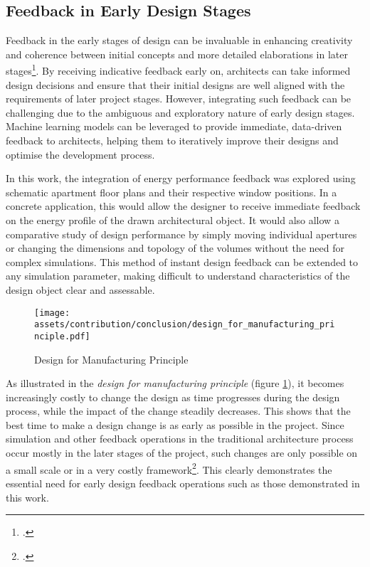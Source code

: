 \documentclass[a4paper, 12pt]{report}
\begin{document}
\subsection{Feedback in Early Design Stages}\label{sec:feedback-in-early-design-stages-conclusion}

Feedback in the early stages of design can be invaluable in enhancing creativity and coherence between initial concepts and more detailed elaborations in later stages\footcite{paterson2013real}. By receiving indicative feedback early on, architects can take informed design decisions and ensure that their initial designs are well aligned with the requirements of later project stages. However, integrating such feedback can be challenging due to the ambiguous and exploratory nature of early design stages. Machine learning models can be leveraged to provide immediate, data-driven feedback to architects, helping them to iteratively improve their designs and optimise the development process.

In this work, the integration of energy performance feedback was explored using schematic apartment floor plans and their respective window positions. In a concrete application, this would allow the designer to receive immediate feedback on the energy profile of the drawn architectural object. It would also allow a comparative study of design performance by simply moving individual \glspl{aperture} or changing the dimensions and topology of the volumes without the need for complex simulations. This method of instant design feedback can be extended to any simulation parameter, making difficult to understand characteristics of the design object clear and assessable.

\begin{figure}
\centering
\texttt{[image: assets/contribution/conclusion/design\_for\_manufacturing\_principle.pdf]}
\caption{Design for Manufacturing Principle}
\label{fig:design_for_manufacturing_principle}
\end{figure}

As illustrated in the \textit{design for manufacturing principle} (figure \ref{fig:design_for_manufacturing_principle}), it becomes increasingly costly to change the design as time progresses during the design process, while the impact of the change steadily decreases. This shows that the best time to make a design change is as early as possible in the project. Since simulation and other feedback operations in the traditional architecture process occur mostly in the later stages of the project, such changes are only possible on a small scale or in a very costly framework\footcite{as2018artificial}. This clearly demonstrates the essential need for early design feedback operations such as those demonstrated in this work.
\end{document}
